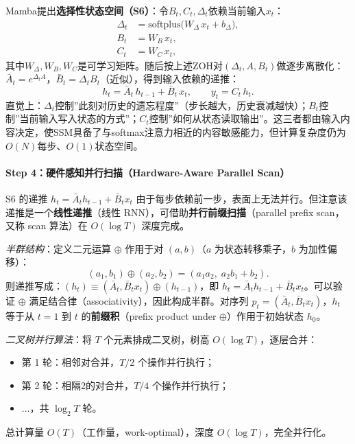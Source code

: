 \documentclass[12pt,a4paper]{article}
\begin{document}
Mamba提出\textbf{选择性状态空间（S6）}：令$B_t, C_t, \Delta_t$依赖当前输入$x_t$：
\begin{align}
\Delta_t &= \text{softplus}\!\bigl(W_\Delta\, x_t + b_\Delta\bigr), \label{eq:mamba-delta}\\
B_t &= W_B\, x_t, \\
C_t &= W_C\, x_t,
\end{align}
其中$W_\Delta, W_B, W_C$是可学习矩阵。随后按上述ZOH对$(\Delta_t, A, B_t)$做逐步离散化：$\bar{A}_t = e^{\Delta_t A}$，$\bar{B}_t = \Delta_t B_t$（近似），得到输入依赖的递推：
\begin{equation}
h_t = \bar{A}_t\, h_{t-1} + \bar{B}_t\, x_t,\qquad y_t = C_t\, h_t.
\end{equation}
直觉上：$\Delta_t$控制”此刻对历史的遗忘程度”（步长越大，历史衰减越快）；$B_t$控制”当前输入写入状态的方式”；$C_t$控制”如何从状态读取输出”。这三者都由输入内容决定，使SSM具备了与softmax注意力相近的内容敏感能力，但计算复杂度仍为$O(N)$每步、$O(1)$状态空间。

\paragraph{Step 4：硬件感知并行扫描（Hardware-Aware Parallel Scan）}

S6 的递推 $h_t = \bar{A}_t h_{t-1} + \bar{B}_t x_t$ 由于每步依赖前一步，表面上无法并行。但注意该递推是一个\textbf{线性递推}（线性 RNN），可借助\textbf{并行前缀扫描}（parallel prefix scan，又称 scan 算法）在 $O(\log T)$ 深度完成。

\textit{半群结构}：定义二元运算 $\oplus$ 作用于对 $(a, b)$（$a$ 为状态转移乘子，$b$ 为加性偏移）：
\begin{equation}
(a_1, b_1) \oplus (a_2, b_2) = (a_1 a_2,\; a_2 b_1 + b_2).
\end{equation}
则递推写成：$(h_t) \equiv (\bar{A}_t, \bar{B}_t x_t) \oplus (h_{t-1})$，即 $h_t = \bar{A}_t h_{t-1} + \bar{B}_t x_t$。可以验证 $\oplus$ 满足结合律（associativity），因此构成半群。对序列 $p_t = (\bar{A}_t, \bar{B}_t x_t)$，$h_t$ 等于从 $t=1$ 到 $t$ 的\textbf{前缀积}（prefix product under $\oplus$）作用于初始状态 $h_0$。

\textit{二叉树并行算法}：将 $T$ 个元素排成二叉树，树高 $O(\log T)$，逐层合并：
\begin{itemize}
    \item 第 1 轮：相邻对合并，$T/2$ 个操作并行执行；
    \item 第 2 轮：相隔2的对合并，$T/4$ 个操作并行执行；
    \item $\ldots$，共 $\log_2 T$ 轮。
\end{itemize}
总计算量 $O(T)$（工作量，work-optimal），深度 $O(\log T)$，完全并行化。
\end{document}
